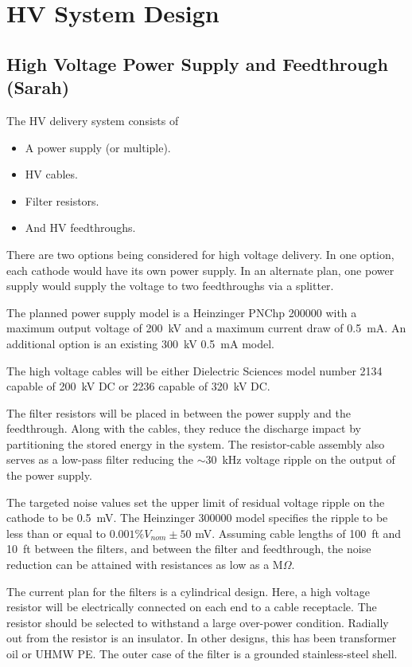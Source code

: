 \section{HV System Design}
\label{sec:fddp-hv-design}

\subsection {High Voltage Power Supply and Feedthrough (Sarah)}
The HV delivery system consists of
\begin{itemize}
\item A power supply (or multiple).
\item HV cables.
\item Filter resistors.
\item And HV feedthroughs.
\end{itemize}

There are two options being considered for high voltage delivery.  In one option, each cathode would have its own power supply.  In an alternate plan, one power supply would supply the voltage to two feedthroughs via a splitter.

The planned power supply model is a Heinzinger PNChp 200000 with a maximum output voltage of \SI{200}{kV} and a maximum current draw of \SI{0.5}{mA}.  An additional option is an existing \SI{300}{kV} \SI{0.5}{mA} model. 

The high voltage cables will be either Dielectric Sciences model number 2134 capable of \SI{200}{kV} DC or 2236 capable of \SI{320}{kV} DC.  

The filter resistors will be placed in between the power supply and the feedthrough.  Along with the cables, they reduce the discharge impact by partitioning the stored energy in the system.  The resistor-cable assembly also serves as a low-pass filter reducing the $\sim$\SI{30}{kHz} voltage ripple on the output of the power supply.

The targeted noise values set the upper limit of residual voltage ripple on the cathode to be \SI{0.5}{mV}.  The Heinzinger 300000 model specifies the ripple to be less than or equal to $0.001\%V_{nom} \pm 50$ mV.  Assuming cable lengths of \SI{100}{ft} and \SI{10}{ft} between the filters, and between the filter and feedthrough, the noise reduction can be attained with resistances as low as a M$\Omega$. 

The current plan for the filters is a cylindrical design.  Here, a high voltage resistor will be electrically connected on each end to a cable receptacle.  The resistor should be selected to withstand a large over-power condition.  Radially out from the resistor is an insulator.  In other designs, this has been transformer oil or UHMW PE.  The outer case of the filter is a grounded stainless-steel shell.

